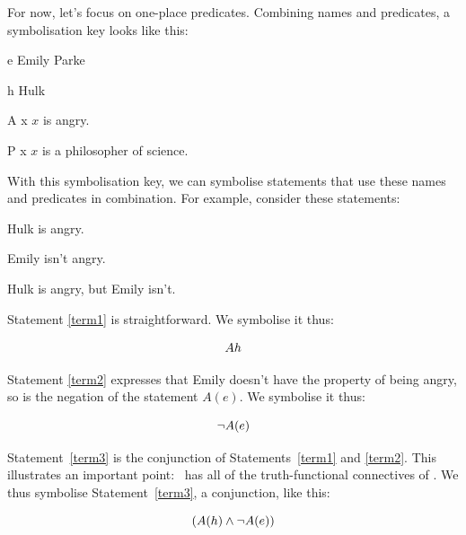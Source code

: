 \documentclass[PHIL101-Textbook.tex]{subfiles}
\begin{document}
For now, let's focus on one-place predicates. Combining names and predicates, a symbolisation key looks like this:
\begin{ekey}
\item[e] Emily Parke
\item[h] Hulk
\item[\atom A x ] $x$ is angry. 
\item[\atom P x ] $x$ is a philosopher of science.
\end{ekey}

\noindent With this symbolisation key, we can symbolise statements that use these names and predicates in combination. For example, consider these statements:
\begin{earg}
\item[\ex{term1}] Hulk is angry.
\item[\ex{term2}] Emily isn't angry. 
\item[\ex{term3}] Hulk is angry, but Emily isn't. 
\end{earg}

\noindent Statement \ref{term1} is straightforward. We symbolise it thus:

$$\mathord{A}{h} $$

\noindent Statement \ref{term2} expresses that Emily doesn't have the property of being angry, so is the negation of the statement $A(e)$. We symbolise it thus:

$$\neg A(e)$$

\noindent Statement~\ref{term3} is the conjunction of Statements~\ref{term1} and \ref{term2}.
This illustrates an important point: \pl\ has all of the truth-functional connectives of \tfl.
We thus symbolise Statement~\ref{term3}, a conjunction, like this: 

$$(A(h) \land \neg A(e))$$


%

\end{document}
